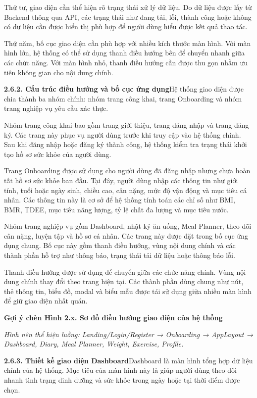 Thứ tư, giao diện cần thể hiện rõ trạng thái xử lý dữ liệu. Do dữ liệu được lấy từ Backend thông qua API, các trạng thái như đang tải, lỗi, thành công hoặc không có dữ liệu cần được hiển thị phù hợp để người dùng hiểu được kết quả thao tác.

Thứ năm, bố cục giao diện cần phù hợp với nhiều kích thước màn hình. Với màn hình lớn, hệ thống có thể sử dụng thanh điều hướng bên để chuyển nhanh giữa các chức năng. Với màn hình nhỏ, thanh điều hướng cần được thu gọn nhằm ưu tiên không gian cho nội dung chính.

\textbf{2.6.2. Cấu trúc điều hướng và bố cục ứng dụng}Hệ thống giao diện được chia thành ba nhóm chính: nhóm trang công khai, trang Onboarding và nhóm trang nghiệp vụ yêu cầu xác thực.

Nhóm trang công khai bao gồm trang giới thiệu, trang đăng nhập và trang đăng ký. Các trang này phục vụ người dùng trước khi truy cập vào hệ thống chính. Sau khi đăng nhập hoặc đăng ký thành công, hệ thống kiểm tra trạng thái khởi tạo hồ sơ sức khỏe của người dùng.

Trang Onboarding được sử dụng cho người dùng đã đăng nhập nhưng chưa hoàn tất hồ sơ sức khỏe ban đầu. Tại đây, người dùng nhập các thông tin như giới tính, tuổi hoặc ngày sinh, chiều cao, cân nặng, mức độ vận động và mục tiêu cá nhân. Các thông tin này là cơ sở để hệ thống tính toán các chỉ số như BMI, BMR, TDEE, mục tiêu năng lượng, tỷ lệ chất đa lượng và mục tiêu nước.

Nhóm trang nghiệp vụ gồm Dashboard, nhật ký ăn uống, Meal Planner, theo dõi cân nặng, luyện tập và hồ sơ cá nhân. Các trang này được đặt trong bố cục ứng dụng chung. Bố cục này gồm thanh điều hướng, vùng nội dung chính và các thành phần hỗ trợ như thông báo, trạng thái tải dữ liệu hoặc thông báo lỗi.

Thanh điều hướng được sử dụng để chuyển giữa các chức năng chính. Vùng nội dung chính thay đổi theo trang hiện tại. Các thành phần dùng chung như nút, thẻ thông tin, biểu đồ, modal và biểu mẫu được tái sử dụng giữa nhiều màn hình để giữ giao diện nhất quán.

\textbf{Gợi ý chèn Hình 2.x. Sơ đồ điều hướng giao diện của hệ thống}

\textit{Hình nên thể hiện luồng: Landing/Login/Register → Onboarding → AppLayout → Dashboard, Diary, Meal Planner, Weight, Exercise, Profile.}

\textbf{2.6.3. Thiết kế giao diện Dashboard}Dashboard là màn hình tổng hợp dữ liệu chính của hệ thống. Mục tiêu của màn hình này là giúp người dùng theo dõi nhanh tình trạng dinh dưỡng và sức khỏe trong ngày hoặc tại thời điểm được chọn.


